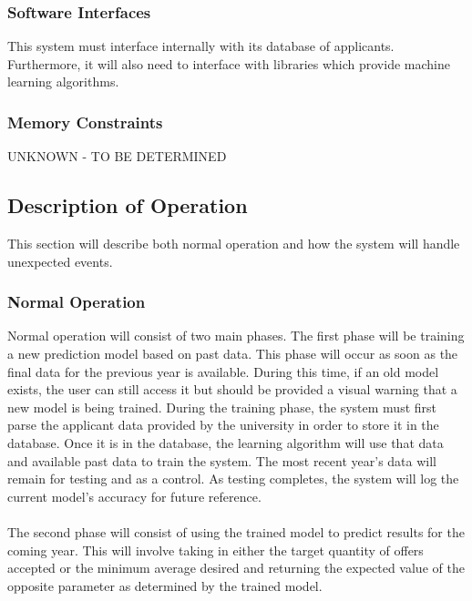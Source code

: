 \documentclass[titlepage]{article}
\begin{document}
\subsubsection{Software Interfaces}
This system must interface internally with its database of applicants. Furthermore, it will also need to interface with libraries which provide machine learning algorithms.
\subsubsection{Memory Constraints}%
UNKNOWN - TO BE DETERMINED


\subsection{Description of Operation}
This section will describe both normal operation and how the system will handle unexpected events.
\subsubsection{Normal Operation}
Normal operation will consist of two main phases. The first phase will be training a new prediction model based on past data. This phase will occur as soon as the final data for the previous year is available. During this time, if an old model exists, the user can still access it but should be provided a visual warning that a new model is being trained. During the training phase, the system must first parse the applicant data provided by the university in order to store it in the database. Once it is in the database, the learning algorithm will use that data and available past data to train the system. The most recent year's data will remain for testing and as a control. As testing completes, the system will log the current model's accuracy for future reference.\\~\\
The second phase will consist of using the trained model to predict results for the coming year. This will involve taking in either the target quantity of offers accepted or the minimum average desired and returning the expected value of the opposite parameter as determined by the trained model.
\end{document}
